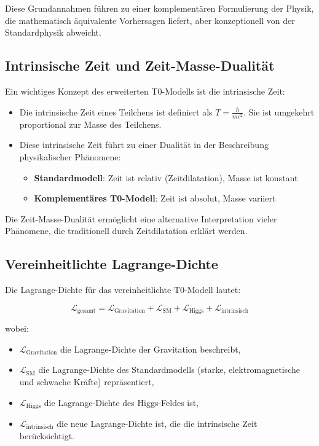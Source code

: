 \documentclass[a4paper,12pt]{article}
\begin{document}
	Diese Grundannahmen führen zu einer komplementären Formulierung der Physik, die mathematisch äquivalente Vorhersagen liefert, aber konzeptionell von der Standardphysik abweicht.
	
	\subsection{Intrinsische Zeit und Zeit-Masse-Dualität}
	
	Ein wichtiges Konzept des erweiterten T0-Modells ist die intrinsische Zeit:
	
	\begin{itemize}
		\item Die intrinsische Zeit eines Teilchens ist definiert als $T = \frac{\hbar}{mc^2}$. Sie ist umgekehrt proportional zur Masse des Teilchens.
		\item Diese intrinsische Zeit führt zu einer Dualität in der Beschreibung physikalischer Phänomene:
		\begin{itemize}
			\item \textbf{Standardmodell}: Zeit ist relativ (Zeitdilatation), Masse ist konstant
			\item \textbf{Komplementäres T0-Modell}: Zeit ist absolut, Masse variiert
		\end{itemize}
	\end{itemize}
	
	Die Zeit-Masse-Dualität ermöglicht eine alternative Interpretation vieler Phänomene, die traditionell durch Zeitdilatation erklärt werden.
	
	\subsection{Vereinheitlichte Lagrange-Dichte}
	
	Die Lagrange-Dichte für das vereinheitlichte T0-Modell lautet:
	
	\begin{equation}
		\mathcal{L}_\text{gesamt} = \mathcal{L}_\text{Gravitation} + \mathcal{L}_\text{SM} + \mathcal{L}_\text{Higgs} + \mathcal{L}_\text{intrinsisch}
	\end{equation}
	
	wobei:
	\begin{itemize}
		\item $\mathcal{L}_\text{Gravitation}$ die Lagrange-Dichte der Gravitation beschreibt,
		\item $\mathcal{L}_\text{SM}$ die Lagrange-Dichte des Standardmodells (starke, elektromagnetische und schwache Kräfte) repräsentiert,
		\item $\mathcal{L}_\text{Higgs}$ die Lagrange-Dichte des Higgs-Feldes ist,
		\item $\mathcal{L}_\text{intrinsisch}$ die neue Lagrange-Dichte ist, die die intrinsische Zeit berücksichtigt.
	\end{itemize}
	
\end{document}
